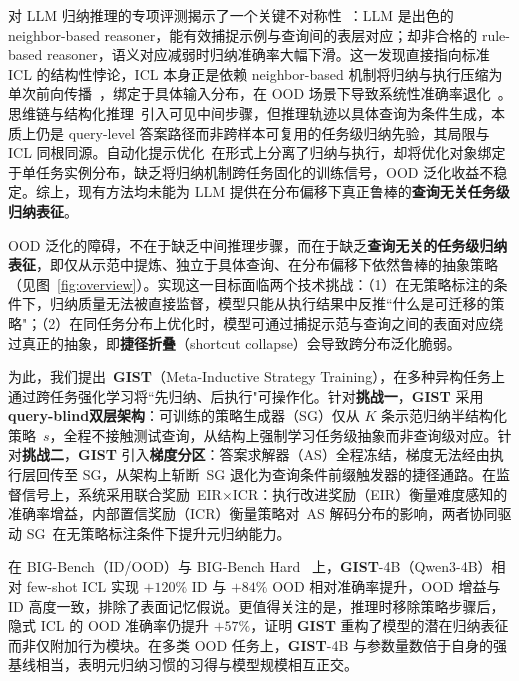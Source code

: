 \documentclass[11pt]{article}
\newcommand{\gist}{\textbf{GIST}}
\newcommand{\mist}{\textbf{GIST}}  %
\newcommand{\sg}{\textnormal{\textsc{SG}}}
\newcommand{\as}{\textnormal{\textsc{AS}}}
\begin{document}
对 LLM 归纳推理的专项评测揭示了一个关键不对称性~\citep{li2025mirage}：LLM 是出色的 neighbor-based reasoner，能有效捕捉示例与查询间的表层对应；却非合格的 rule-based reasoner，语义对应减弱时归纳准确率大幅下滑。这一发现直接指向标准 ICL 的结构性悖论，ICL 本身正是依赖 neighbor-based 机制将归纳与执行压缩为单次前向传播~\citep{xie2022icl_bayesian,akyurek2023icl_algorithm}，绑定于具体输入分布，在 OOD 场景下导致系统性准确率退化~\citep{min2022rethinking,wang2024icl_ood}。思维链与结构化推理~\citep{wei2022cot,zhou2024selfdiscover}引入可见中间步骤，但推理轨迹以具体查询为条件生成，本质上仍是 query-level 答案路径而非跨样本可复用的任务级归纳先验，其局限与 ICL 同根同源。自动化提示优化~\citep{zhou2023ape,yang2024opro,fernando2023promptbreeder,agrawal2025gepa}在形式上分离了归纳与执行，却将优化对象绑定于单任务实例分布，缺乏将归纳机制跨任务固化的训练信号，OOD 泛化收益不稳定。综上，现有方法均未能为 LLM 提供在分布偏移下真正鲁棒的\textbf{查询无关任务级归纳表征}。

OOD 泛化的障碍，不在于缺乏中间推理步骤，而在于缺乏\textbf{查询无关的任务级归纳表征}，即仅从示范中提炼、独立于具体查询、在分布偏移下依然鲁棒的抽象策略（见图~\ref{fig:overview}）。实现这一目标面临两个技术挑战：（1）在无策略标注的条件下，归纳质量无法被直接监督，模型只能从执行结果中反推“什么是可迁移的策略"；（2）在同任务分布上优化时，模型可通过捕捉示范与查询之间的表面对应绕过真正的抽象，即\textbf{捷径折叠}（shortcut collapse）会导致跨分布泛化脆弱。

为此，我们提出 \mist{}（Meta-Inductive Strategy Training），在多种异构任务上通过跨任务强化学习将“先归纳、后执行"可操作化。针对\textbf{挑战一}，\mist{} 采用\textbf{query-blind双层架构}：可训练的策略生成器（\sg{}）仅从 $K$ 条示范归纳半结构化策略 $s$，全程不接触测试查询，从结构上强制学习任务级抽象而非查询级对应。针对\textbf{挑战二}，\mist{} 引入\textbf{梯度分区}：答案求解器（\as{}）全程冻结，梯度无法经由执行层回传至 \sg{}，从架构上斩断 \sg{} 退化为查询条件前缀触发器的捷径通路。在监督信号上，系统采用联合奖励 EIR$\times$ICR：执行改进奖励（EIR）衡量难度感知的准确率增益，内部置信奖励（ICR）衡量策略对 \as{} 解码分布的影响，两者协同驱动 \sg{} 在无策略标注条件下提升元归纳能力。

在 BIG-Bench（ID/OOD）与 BIG-Bench Hard~\citep{srivastava2023bigbench,suzgun2022bbh} 上，\mist{}-4B（Qwen3-4B）相对 few-shot ICL 实现 $+120\%$ ID 与 $+84\%$ OOD 相对准确率提升，OOD 增益与 ID 高度一致，排除了表面记忆假说。更值得关注的是，推理时移除策略步骤后，隐式 ICL 的 OOD 准确率仍提升 $+57\%$，证明 \mist{} 重构了模型的潜在归纳表征而非仅附加行为模块。在多类 OOD 任务上，\mist{}-4B 与参数量数倍于自身的强基线相当，表明元归纳习惯的习得与模型规模相互正交。
\end{document}
